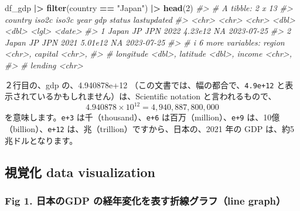 \documentclass[
  xelatex, ja=standard]{bxjsbook}
\newenvironment{Shaded}{\begin{snugshade}}{\end{snugshade}}
\newcommand{\CommentTok}[1]{\textcolor[rgb]{0.56,0.35,0.01}{\textit{#1}}}
\newcommand{\DecValTok}[1]{\textcolor[rgb]{0.00,0.00,0.81}{#1}}
\newcommand{\FunctionTok}[1]{\textcolor[rgb]{0.13,0.29,0.53}{\textbf{#1}}}
\newcommand{\NormalTok}[1]{#1}
\newcommand{\SpecialCharTok}[1]{\textcolor[rgb]{0.81,0.36,0.00}{\textbf{#1}}}
\newcommand{\StringTok}[1]{\textcolor[rgb]{0.31,0.60,0.02}{#1}}
\theoremstyle{definition}
\theoremstyle{definition}
\theoremstyle{definition}
\theoremstyle{definition}
\theoremstyle{remark}
\begin{document}
\begin{Shaded}
\begin{Highlighting}[]
\NormalTok{df\_gdp }\SpecialCharTok{|\textgreater{}} \FunctionTok{filter}\NormalTok{(country }\SpecialCharTok{==} \StringTok{"Japan"}\NormalTok{) }\SpecialCharTok{|\textgreater{}} \FunctionTok{head}\NormalTok{(}\DecValTok{2}\NormalTok{)}
\CommentTok{\#\textgreater{} \# A tibble: 2 x 13}
\CommentTok{\#\textgreater{}   country iso2c iso3c  year     gdp status lastupdated}
\CommentTok{\#\textgreater{}   \textless{}chr\textgreater{}   \textless{}chr\textgreater{} \textless{}chr\textgreater{} \textless{}dbl\textgreater{}   \textless{}dbl\textgreater{} \textless{}lgl\textgreater{}  \textless{}date\textgreater{}     }
\CommentTok{\#\textgreater{} 1 Japan   JP    JPN    2022 4.23e12 NA     2023{-}07{-}25 }
\CommentTok{\#\textgreater{} 2 Japan   JP    JPN    2021 5.01e12 NA     2023{-}07{-}25 }
\CommentTok{\#\textgreater{} \# i 6 more variables: region \textless{}chr\textgreater{}, capital \textless{}chr\textgreater{},}
\CommentTok{\#\textgreater{} \#   longitude \textless{}dbl\textgreater{}, latitude \textless{}dbl\textgreater{}, income \textless{}chr\textgreater{},}
\CommentTok{\#\textgreater{} \#   lending \textless{}chr\textgreater{}}
\end{Highlighting}
\end{Shaded}

２行目の、gdp の、4.940878e+12 （この文書では、幅の都合で、\texttt{4.9e+12} と表示されているかもしれません）は、Scientific notation と言われるもので、 \[4.940878 \times 10^{12} = 4,940,887,800,000\] を意味します。\texttt{e+3} は千（thousand）、\texttt{e+6} は百万（million）、\texttt{e+9} は、10億（billion）、\texttt{e+12} は、兆（trillion）ですから、日本の、2021 年の GDP は、約5兆ドルとなります。

\hypertarget{ux8996ux899aux5316-data-visualization}{%
\subsection{視覚化 data visualization}\label{ux8996ux899aux5316-data-visualization}}

\hypertarget{fig-1.-ux65e5ux672cux306egdp-ux306eux7d4cux5e74ux5909ux5316ux3092ux8868ux3059ux6298ux7ddaux30b0ux30e9ux30d5line-graph}{%
\subsubsection{Fig 1. 日本のGDP の経年変化を表す折線グラフ（line graph）}\label{fig-1.-ux65e5ux672cux306egdp-ux306eux7d4cux5e74ux5909ux5316ux3092ux8868ux3059ux6298ux7ddaux30b0ux30e9ux30d5line-graph}}
\end{document}
